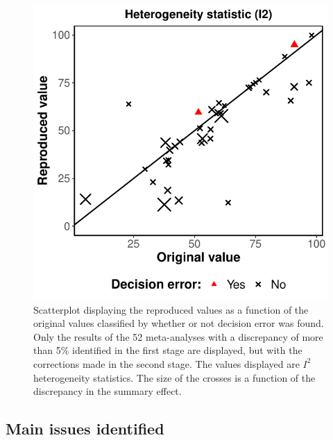 \documentclass[
  ,man,floatsintext]{apa6}
\begin{document}
\begin{figure}
\centering
\includegraphics{submission_files/figure-latex/unnamed-chunk-5-1.pdf}
\caption{\label{fig:unnamed-chunk-5}Scatterplot displaying the reproduced values as a function of the original values classified by whether or not decision error was found. Only the results of the 52 meta-analyses with a discrepancy of more than 5\% identified in the first stage are displayed, but with the corrections made in the second stage. The values displayed are \(I^2\) heterogeneity statistics. The size of the crosses is a function of the discrepancy in the summary effect.}
\end{figure}

\hypertarget{main-issues-identified}{%
\subsection{Main issues identified}\label{main-issues-identified}}
\end{document}
